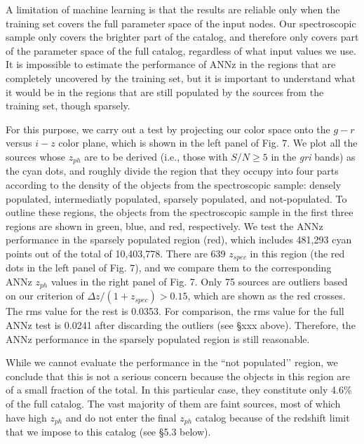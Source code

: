 \documentclass[apj,iop]{emulateapj}
\begin{document}
A limitation of machine learning is that the results are reliable only when the training set covers the full parameter space of the input nodes. Our spectroscopic sample only covers the brighter part of the catalog, and therefore only covers part of the parameter space of the full catalog, regardless of what input values we use. It is impossible to estimate the performance of ANNz in the regions that are completely uncovered by the training set, but it is important to understand what it would be in the regions that are still populated by the sources from the training set, though sparsely. 

For this purpose, we carry out a test by projecting our color space onto the $g-r$ versus $i-z$ color plane, which is shown in the left panel of Fig. 7. We plot all the sources whose $z_{ph}$ are to be derived (i.e., those with $S/N\geq 5$ in the {\it gri} bands) as the cyan dots, and roughly divide the region that they occupy into four parts according to the density of the objects from the spectroscopic sample: densely populated, intermediatly populated, sparsely populated, and not-populated. To outline these regions, the objects from the spectroscopic sample in the first three regions are shown in green, blue, and red, respectively. We test the ANNz performance in the sparsely populated region (red), which includes 481,293 cyan points out of the total of 10,403,778. There are 639 $z_{spec}$ in this region (the red dots in the left panel of Fig. 7), and we compare them to the corresponding ANNz $z_{ph}$ values in the right panel of Fig. 7. Only 75 sources are outliers based on our criterion of $\Delta z/(1+z_{spec}) > 0.15$, which are shown as the red crosses. The rms value for the rest is 0.0353. For comparison, the rms value for the full ANNz test is 0.0241 after discarding the outliers  (see \S xxx above). Therefore, the ANNz performance in the sparsely populated region is still reasonable. 

While we cannot evaluate the performance in the ``not populated’’ region, we conclude that this is not a serious concern because the objects in this region are of a small fraction of the total. In this particular case, they constitute only 4.6\% of the full catalog. The vast majority of them are faint sources, most of which have high $z_{ph}$ and do not enter the final $z_{ph}$ catalog because of the redshift limit that we impose to this catalog (see \S 5.3 below).
\end{document}

